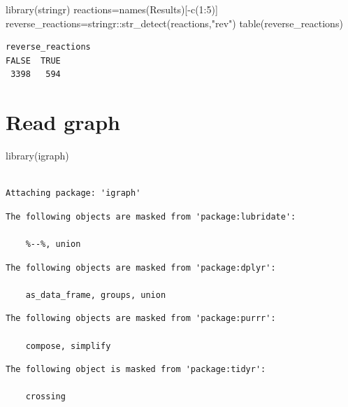 \documentclass[
  letterpaper,
  DIV=11,
  numbers=noendperiod]{scrreprt}
\newenvironment{Shaded}{\begin{snugshade}}{\end{snugshade}}
\newcommand{\DecValTok}[1]{\textcolor[rgb]{0.68,0.00,0.00}{#1}}
\newcommand{\FunctionTok}[1]{\textcolor[rgb]{0.28,0.35,0.67}{#1}}
\newcommand{\NormalTok}[1]{\textcolor[rgb]{0.00,0.23,0.31}{#1}}
\newcommand{\OtherTok}[1]{\textcolor[rgb]{0.00,0.23,0.31}{#1}}
\newcommand{\SpecialCharTok}[1]{\textcolor[rgb]{0.37,0.37,0.37}{#1}}
\newcommand{\StringTok}[1]{\textcolor[rgb]{0.13,0.47,0.30}{#1}}
\begin{document}
\begin{Shaded}
\begin{Highlighting}[]
\FunctionTok{library}\NormalTok{(stringr)}
\NormalTok{reactions}\OtherTok{=}\FunctionTok{names}\NormalTok{(Results)[}\SpecialCharTok{{-}}\FunctionTok{c}\NormalTok{(}\DecValTok{1}\SpecialCharTok{:}\DecValTok{5}\NormalTok{)]}
\NormalTok{reverse\_reactions}\OtherTok{=}\NormalTok{stringr}\SpecialCharTok{::}\FunctionTok{str\_detect}\NormalTok{(reactions,}\StringTok{"rev"}\NormalTok{)}
\FunctionTok{table}\NormalTok{(reverse\_reactions)}
\end{Highlighting}
\end{Shaded}

\begin{verbatim}
reverse_reactions
FALSE  TRUE 
 3398   594 
\end{verbatim}


\hypertarget{read-graph}{%
\chapter{Read graph}\label{read-graph}}

\begin{Shaded}
\begin{Highlighting}[]
\FunctionTok{library}\NormalTok{(igraph)}
\end{Highlighting}
\end{Shaded}

\begin{verbatim}

Attaching package: 'igraph'
\end{verbatim}

\begin{verbatim}
The following objects are masked from 'package:lubridate':

    %--%, union
\end{verbatim}

\begin{verbatim}
The following objects are masked from 'package:dplyr':

    as_data_frame, groups, union
\end{verbatim}

\begin{verbatim}
The following objects are masked from 'package:purrr':

    compose, simplify
\end{verbatim}

\begin{verbatim}
The following object is masked from 'package:tidyr':

    crossing
\end{verbatim}
\end{document}
